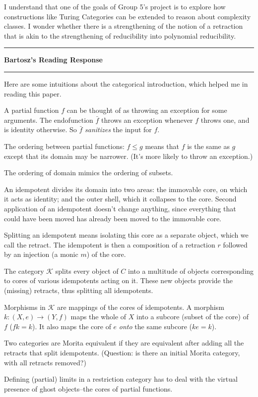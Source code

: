 \documentclass{amsart}
\newcommand{\iam}[1]{
  \vspace{0.25em}
  \hrule
  \vspace{0.25em}
  \textbf{{#1}'s Reading Response}
  \vspace{0.25em}
  \hrule
  \vspace{1em}
}
\begin{document}
I understand that one of the goals of Group 5's project is to explore how constructions like Turing Categories can be extended to reason about complexity classes. I wonder whether there is a strengthening of the notion of a retraction that is akin to the strengthening of reducibility into polynomial reducibility.

\iam{Bartosz}
Here are some intuitions about the categorical introduction, which helped me in reading this paper.

A partial function $f$ can be thought of as throwing an exception for some arguments. The endofunction $\bar{f}$ throws an exception whenever $f$ throws one, and is identity otherwise. So $\bar{f}$ \textit{sanitizes} the input for $f$.

The ordering between partial functions: $f \leq g$ means that $f$ is the same as $g$ except that its domain may be narrower. (It's more likely to throw an exception.)

The ordering of domain mimics the ordering of subsets.

An idempotent divides its domain into two areas: the immovable core, on which it acts as identity; and the outer shell, which it collapses to the core. Second application of an idempotent doesn't change anything, since everything that could have been moved has already been moved to the immovable core.

Splitting an idempotent means isolating this core as a separate object, which we call the retract. The idempotent is then a composition of a retraction $r$ followed by an injection (a monic $m$) of the core.

The category $\mathscr{K}$ splits every object of $C$ into a multitude of objects corresponding to cores of various idempotents acting on it. These new objects provide the (missing) retracts, thus splitting all idempotents.

Morphisms in $\mathscr{K}$ are mappings of the cores of idempotents. A morphism $k \colon (X, e) \to (Y, f)$ maps the whole of $X$ into a subcore (subset of the core) of $f$ ($fk=k$). It also maps the core of $e$ \textit{onto} the same subcore ($ke=k$).

Two categories are Morita equivalent if they are equivalent after adding all the retracts that split idempotents. (Question: is there an initial Morita category, with all retracts removed?)

Defining (partial) limits in a restriction category has to deal with the virtual presence of ghost objects--the cores of partial functions.
\end{document}
